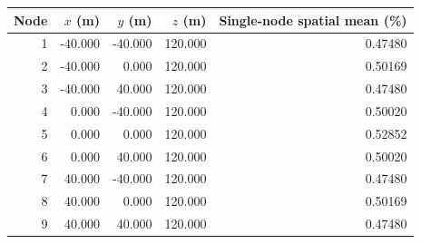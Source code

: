 \begin{tabular}{rrrrr}
\toprule
Node & $x$ (m) & $y$ (m) & $z$ (m) & Single-node spatial mean (\%) \\
\midrule
1 & -40.000 & -40.000 & 120.000 & 0.47480 \\
2 & -40.000 & 0.000 & 120.000 & 0.50169 \\
3 & -40.000 & 40.000 & 120.000 & 0.47480 \\
4 & 0.000 & -40.000 & 120.000 & 0.50020 \\
5 & 0.000 & 0.000 & 120.000 & 0.52852 \\
6 & 0.000 & 40.000 & 120.000 & 0.50020 \\
7 & 40.000 & -40.000 & 120.000 & 0.47480 \\
8 & 40.000 & 0.000 & 120.000 & 0.50169 \\
9 & 40.000 & 40.000 & 120.000 & 0.47480 \\
\bottomrule
\end{tabular}
